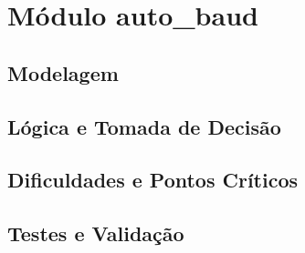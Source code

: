 ﻿%
\section{Módulo auto_baud}
\subsection{Modelagem}
\subsection{Lógica e Tomada de Decisão}
\subsection{Dificuldades e Pontos Críticos}
\subsection{Testes e Validação}

